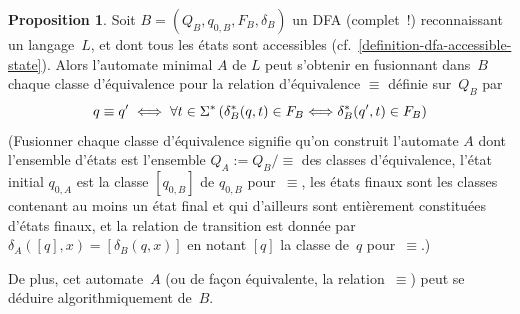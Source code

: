 \documentclass[12pt,a4paper]{article}
\theoremstyle{definition}
\newtheorem{prop}[comcnt]{Proposition}
\newcommand{\liff}{\mathrel{\Longleftrightarrow}\relax}
\begin{document}
\begin{prop}\label{dfa-minimization}
Soit $B = (Q_B, q_{0,B}, F_B, \delta_B)$ un DFA (complet !)
reconnaissant un langage $L$, et dont tous les états sont accessibles
(cf. \ref{definition-dfa-accessible-state}).  Alors l'automate
minimal $A$ de $L$ peut s'obtenir en fusionnant dans $B$ chaque
classe d'équivalence pour la relation d'équivalence $\equiv$ définie
sur $Q_B$ par
\[
q \equiv q' \;\liff\; \forall t\in\Sigma^*\,(\delta^*_B(q,t)\in F_B \liff \delta^*_B(q',t)\in F_B)
\]
(Fusionner chaque classe d'équivalence signifie qu'on construit
l'automate $A$ dont l'ensemble d'états est l'ensemble $Q_A :=
Q_B/{\equiv}$ des classes d'équivalence, l'état initial $q_{0,A}$ est
la classe $[q_{0,B}]$ de $q_{0,B}$ pour $\equiv$, les états finaux
sont les classes contenant au moins un état final et qui d'ailleurs
sont entièrement constituées d'états finaux, et la relation de
transition est donnée par $\delta_A([q],x) = [\delta_B(q,x)]$ en
notant $[q]$ la classe de $q$ pour $\equiv$.)

De plus, cet automate $A$ (ou de façon équivalente, la
relation $\equiv$) peut se déduire algorithmiquement de $B$.
\end{prop}
\end{document}

